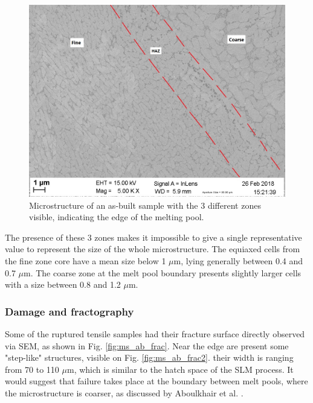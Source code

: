 \begin{figure}[ht]
	\centering
	\centerline{\includegraphics[scale=0.50]{Images/SEM-7b-18.png}}
	\decoRule
	\caption[Microstructure of an as-built sample with the 3 different zones visible, indicating the edge of the melting pool]{Microstructure of an as-built sample with the 3 different zones visible, indicating the edge of the melting pool.}
	\label{fig:ms_zones}
\end{figure}

The presence of these 3 zones makes it impossible to give a single representative value to represent the size of the whole microstructure. The equiaxed cells from the fine zone core have a mean size below 1 $\mu$m, lying generally between 0.4 and 0.7 $\mu$m. The coarse zone at the melt pool boundary presents slightly larger cells with a size between 0.8 and 1.2 $\mu$m.

\subsubsection{Damage and fractography}

 Some of the ruptured tensile samples had their fracture surface directly observed via SEM, as shown in Fig. \ref{fig:ms_ab_frac}. Near the edge are present some "step-like" structures, visible on Fig. \ref{fig:ms_ab_frac2}. their width is ranging from 70 to 110 $\mu$m, which is similar to the hatch space of the SLM process. It would suggest that failure takes place at the boundary between melt pools, where the microstructure is coarser, as discussed by Aboulkhair et al. \cite{Rosenthal17}.\\

